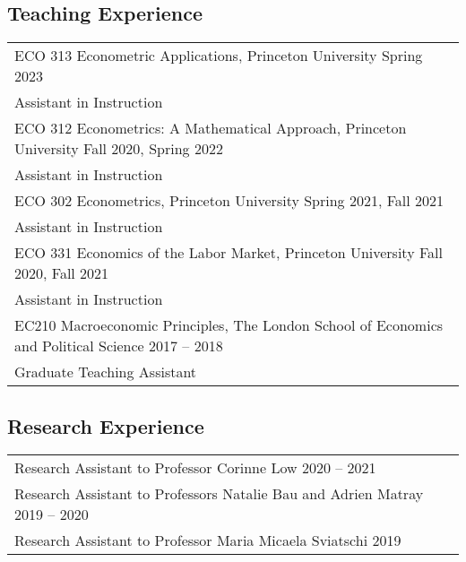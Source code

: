 \documentclass[letterpaper]{article}
\begin{document}
\subsection*{Teaching Experience}
\begin{tabularx}{\textwidth}{X}
ECO 313 Econometric Applications, Princeton University \hfill Spring 2023 \\
\small Assistant in Instruction \\ [0.5em]
ECO 312 Econometrics: A Mathematical Approach, Princeton University \hfill Fall 2020, Spring 2022 \\
\small Assistant in Instruction \\ [0.5em]
ECO 302 Econometrics, Princeton University \hfill Spring 2021, Fall 2021 \\
\small Assistant in Instruction \\ [0.5em]
ECO 331 Economics of the Labor Market, Princeton University \hfill Fall 2020, Fall 2021 \\ 
\small Assistant in Instruction \\ [0.5em]
EC210 Macroeconomic Principles, The London School of Economics and Political Science \hfill 2017 -- 2018 \\
\small Graduate Teaching Assistant \\ [0.5em]
\end{tabularx}

\subsection*{Research Experience}
\begin{tabularx}{\textwidth}{X}
Research Assistant to Professor Corinne Low \hfill 2020 -- 2021 \\ [0.5em]
Research Assistant to Professors Natalie Bau and Adrien Matray \hfill 2019 -- 2020 \\ [0.5em]
Research Assistant to Professor Maria Micaela Sviatschi \hfill 2019
\end{tabularx}

\end{document}

